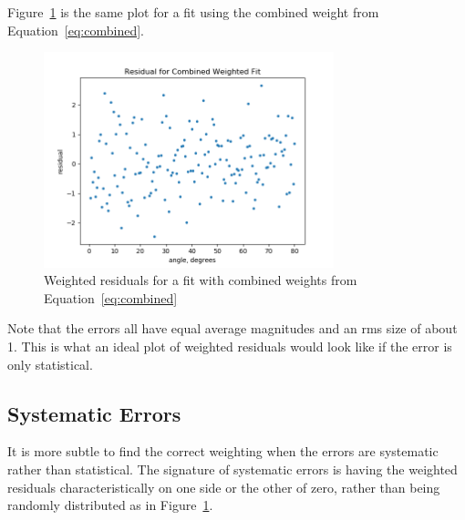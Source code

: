 \documentclass[english]{scrartcl}
\begin{document}
Figure~\ref{fig:res-combweight} is the same plot for a fit
using the combined weight from Equation~\ref{eq:combined}.
\begin{figure}[htb]
  \begin{center}
    \includegraphics[width=0.75\textwidth]{images/res-combweight}
  \end{center}
  \caption{\label{fig:res-combweight}Weighted residuals
  for a fit with combined weights from Equation~\ref{eq:combined}}
\end{figure}
Note that the errors all have equal average
magnitudes and an
rms size of about 1. This is what an ideal plot of weighted
residuals would look like if the error is only statistical.

\subsection{Systematic Errors}
It is more subtle to find the correct weighting when
the errors are systematic rather than statistical. The
signature of systematic errors is having the weighted
residuals characteristically on one side or the other
of zero, rather than being randomly distributed as
in Figure~\ref{fig:res-combweight}.
\end{document}
